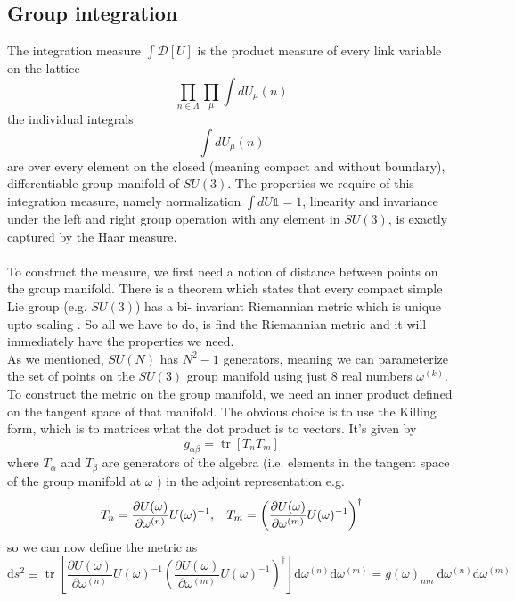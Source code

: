 \documentclass[a4paper,10pt]{book}
\begin{document}
\subsection{Group integration}
The integration measure $\int \mathcal{D}[U]$ is the product measure of every link variable on the lattice
\begin{equation}
\prod\limits_{n\in \Lambda}\prod\limits_{\mu}\int dU_\mu(n)
\end{equation}
the individual integrals
\begin{equation}
\int dU_\mu(n)
\end{equation}
are over every element on the closed (meaning compact and without boundary), differentiable group manifold of $SU(3)$. The properties we require of this integration measure, namely normalization $\int dU \mathbb{1} = 1$, linearity and invariance under the left and right group operation with any element in $SU(3)$, is exactly captured by the Haar measure.\\\\To construct the measure, we first need a notion of distance between points on the group manifold. There is a theorem which states that every compact simple Lie group (e.g. $SU(3)$) has a bi- invariant Riemannian metric which is unique upto scaling \cite{Gallier2020}. So all we have to do, is find the Riemannian metric and it will immediately have the properties we need.\\ As we mentioned, $SU(N)$ has $N^2-1$ generators, meaning we can parameterize the set of points on the $SU(3)$ group manifold using just $8$ real numbers $\omega^{(k)}$. To construct the metric on the group manifold, we need an inner product defined on the tangent space of that manifold. The obvious choice is to use the Killing form, which is to matrices what the dot product is to vectors. It's given by 
\begin{equation}
g_{\alpha\beta} = \operatorname{tr}\left[ T_n T_m \right]
\end{equation}
where $T_\alpha$ and  $T_\beta$ are generators of the algebra (i.e. elements in the tangent space of the group manifold at $\omega$ ) in the adjoint representation e.g. 
\begin{equation}
 T_n = \frac{\partial U(\omega)}{\partial \omega^{(n)}} U(\omega)^{-1},\hspace{3mm} T_m = \left(\frac{\partial U(\omega)}{\partial \omega^{(m)}} U(\omega)^{-1}\right)^{\dagger}
\end{equation}
so we can now define the metric as
\begin{equation}
\mathrm{d} s^{2} \equiv \operatorname{tr}\left[\frac{\partial U(\omega)}{\partial \omega^{(n)}} U(\omega)^{-1}\left(\frac{\partial U(\omega)}{\partial \omega^{(m)}} U(\omega)^{-1}\right)^{\dagger}\right] \mathrm{d} \omega^{(n)} \mathrm{d} \omega^{(m)}=g(\omega)_{n m} \mathrm{~d} \omega^{(n)} \mathrm{d} \omega^{(m)}
\end{equation}
\end{document}
